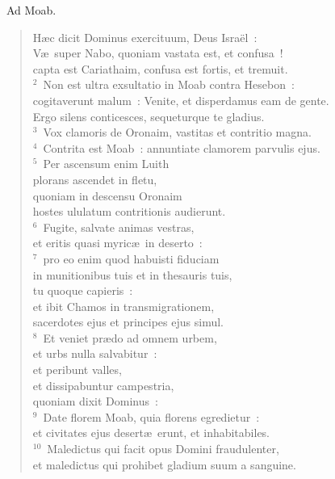 ~\lettrine[lines=10,image=true,loversize=0.05,lraise=-0.03]{A}{}d Moab. \begin{flushleft}\begin{verse}\vspace{6pt}H\ae c dicit Dominus exercituum, Deus Isra\"el~:\\ V\ae\ super Nabo, quoniam vastata est, et confusa~!\\ capta est Cariathaim, confusa est fortis, et tremuit.\\
${}^{2}$~Non est ultra exsultatio in Moab contra Hesebon~:\\ cogitaverunt malum~: Venite, et disperdamus eam de gente.\\ Ergo silens conticesces, sequeturque te gladius.\\
${}^{3}$~Vox clamoris de Oronaim, vastitas et contritio magna.\\
${}^{4}$~Contrita est Moab~: annuntiate clamorem parvulis ejus.\\
${}^{5}$~Per ascensum enim Luith\\ plorans ascendet in fletu,\\ quoniam in descensu Oronaim\\ hostes ululatum contritionis audierunt.\\
${}^{6}$~Fugite, salvate animas vestras,\\ et eritis quasi myric\ae\ in deserto~:\\
${}^{7}$~pro eo enim quod habuisti fiduciam\\ in munitionibus tuis et in thesauris tuis,\\ tu quoque capieris~:\\ et ibit Chamos in transmigrationem,\\ sacerdotes ejus et principes ejus simul.\\
${}^{8}$~Et veniet pr\ae do ad omnem urbem,\\ et urbs nulla salvabitur~:\\ et peribunt valles,\\ et dissipabuntur campestria,\\ quoniam dixit Dominus~:\\
${}^{9}$~Date florem Moab, quia florens egredietur~:\\ et civitates ejus desert\ae\ erunt, et inhabitabiles.\\
${}^{10}$~Maledictus qui facit opus Domini fraudulenter,\\ et maledictus qui prohibet gladium suum a sanguine.\\

\end{verse}
\end{flushleft}
